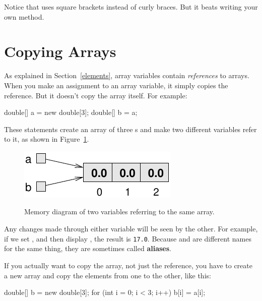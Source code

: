Notice that  uses square brackets instead of curly braces.
But it beats writing your own  method.


\section{Copying Arrays}


As explained in Section~\ref{elements}, array variables contain {\em references} to arrays.
When you make an assignment to an array variable, it simply copies the reference.
But it doesn't copy the array itself.
For example:

\begin{code}
double[] a = new double[3];
double[] b = a;
\end{code}

These statements create an array of three s and make two different variables refer to it, as shown in Figure~\ref{fig.array3}.


\begin{figure}[!ht]
\begin{center}
\includegraphics[alt={Memory diagram showing two variables a and b both pointing to the same array, demonstrating aliasing where changes to one variable affect the other}]{figs/array3.pdf}
\caption{Memory diagram of two variables referring to the same array.}
\label{fig.array3}
\end{center}
\end{figure}


Any changes made through either variable will be seen by the other.
For example, if we set , and then display , the result is {\tt 17.0}.
Because  and  are different names for the same thing, they are sometimes called {\bf aliases}.

If you actually want to copy the array, not just the reference, you have to create a new array and copy the elements from one to the other, like this:

\begin{code}
double[] b = new double[3];
for (int i = 0; i < 3; i++) {
    b[i] = a[i];
}
\end{code}

